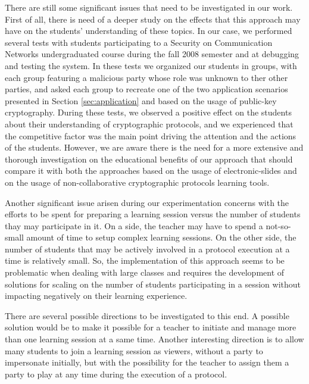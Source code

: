 \documentclass[10pt,conference]{IEEEtran}
\begin{document}
There are still some significant issues that need to be
investigated in our work. First of all, there is need of a deeper study on
the effects that this approach may have on
the students' understanding of these topics. In our case, we performed
several tests with students participating to a Security on
Communication Networks undergraduated course during the fall 2008
semester and at debugging and testing the system. In these tests we
organized our students in groups, with each group featuring a
malicious party whose role was unknown to ther other parties, and
asked each group to recreate one of the two application scenarios
presented in Section \ref{sec:application} and based on the usage of public-key cryptography.
During these tests, we observed a positive effect on the students
about their understanding of cryptographic protocols, and we
experienced that the competitive factor was the main point driving the
attention and the actions of the students. However, we are aware there is the need
for a more extensive and thorough investigation on the educational
benefits of our approach that should compare it with both the approaches based on the usage of
electronic-slides and on the usage of non-collaborative cryptographic
protocols learning tools.

Another significant issue arisen during our experimentation concerns
with the efforts
to be spent for preparing a learning session versus the number of
students thay may participate in it. On a side, the teacher may have
to spend a not-so-small amount of time to setup complex learning
sessions. On the other side, the number of students that may be
actively involved in a protocol execution at a time is relatively
small. So, the implementation of this approach seems to be problematic when dealing
with large classes and requires the development of solutions for
scaling on the number of students participating in a session without
impacting negatively on their learning experience. 

There are several possible directions to be investigated to this
end. A possible solution would be to make it possible for a teacher to
initiate and manage more than one learning session at a same
time. Another interesting direction is to allow many students to join a learning
session as viewers, without a party to impersonate initially, but with
the possibility for the teacher to assign them a party to play at any
time during the execution of a protocol.

 

\end{document}
